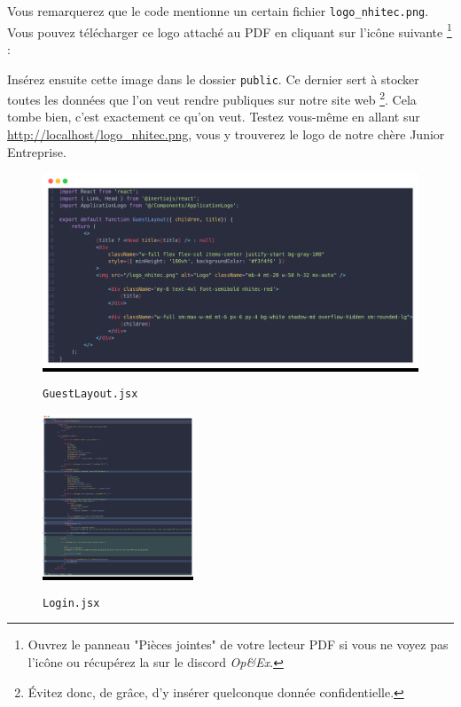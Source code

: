 \begin{figure}
\hspace{0.025\textwidth}
\vspace{-0.75cm}
    \par\medskip
{}

\bigskip
\end{figure}

Vous remarquerez que le code mentionne un certain fichier \texttt{logo\_nhitec.png}.
Vous pouvez télécharger ce logo attaché au PDF en cliquant sur l'icône suivante \footnote{Ouvrez le panneau "Pièces jointes" de votre lecteur PDF si vous ne voyez pas l'icône ou récupérez la sur le discord \textit{Op\&Ex}.} :

Insérez ensuite cette image dans le dossier \texttt{public}. Ce dernier sert à stocker toutes les données que l'on veut rendre publiques sur notre site web \footnote{Évitez donc, de grâce, d'y insérer quelconque donnée confidentielle.}. Cela tombe bien, c'est exactement ce qu'on veut. Testez vous-même en allant sur \url{http://localhost/logo_nhitec.png}, vous y trouverez le logo de notre chère Junior Entreprise.

\begin{figure}[h]
    \centering
    \colorbox{black}{\includegraphics[width=0.8\linewidth]{figures-C1/guestlayout.png}}
    \caption{\texttt{GuestLayout.jsx}}
    \label{fig:guestlayout}
\end{figure}

\newpage


\begin{figure}
    \vspace{-2.5cm}
    \colorbox{black}{\includegraphics[width=0.4\textwidth]{figures-C1/login.png}}
    \caption{\texttt{Login.jsx}}
\end{figure}

